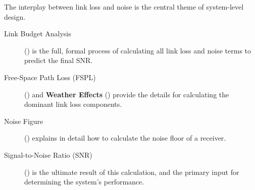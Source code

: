\begin{importantbox}[title={Further Reading}]
    The interplay between link loss and noise is the central theme of system-level design.
    \begin{description}
        \item[Link Budget Analysis] () is the full, formal process of calculating all link loss and noise terms to predict the final SNR.
        \item[Free-Space Path Loss (FSPL)] () and \textbf{Weather Effects} () provide the details for calculating the dominant link loss components.
        \item[Noise Figure] () explains in detail how to calculate the noise floor of a receiver.
        \item[Signal-to-Noise Ratio (SNR)] () is the ultimate result of this calculation, and the primary input for determining the system's performance.
    \end{description}
\end{importantbox}
